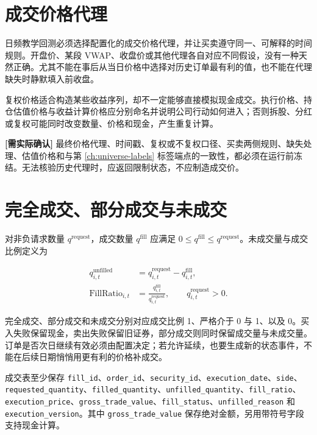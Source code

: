 \section{成交价格代理}

日频教学回测必须选择配置化的成交价格代理，并让买卖遵守同一、可解释的时间规则。开盘价、某段 VWAP、收盘价或其他代理各自对应不同假设，没有一种天然正确。尤其不能在事后从当日价格中选择对历史订单最有利的值，也不能在代理缺失时静默填入前收盘。

复权价格适合构造某些收益序列，却不一定能够直接模拟现金成交。执行价格、持仓估值价格与收益计算价格应分别命名并说明公司行动如何进入；否则拆股、分红或复权可能同时改变数量、价格和现金，产生重复计算。

\begin{confirmbox}
\textbf{[需实际确认]} 最终价格代理、时间戳、复权或不复权口径、买卖两侧规则、缺失处理、估值价格和与第 \cref{ch:universe-labels} 标签端点的一致性，都必须在运行前冻结。无法核验历史代理时，应返回限制状态，不应制造成交价。
\end{confirmbox}

\section{完全成交、部分成交与未成交}

对非负请求数量 \(q^{\mathrm{request}}\)，成交数量 \(q^{\mathrm{fill}}\) 应满足 \(0\le q^{\mathrm{fill}}\le q^{\mathrm{request}}\)。未成交量与成交比例定义为

\begin{align}
  q^{\mathrm{unfilled}}_{i,t}
  &=q^{\mathrm{request}}_{i,t}-q^{\mathrm{fill}}_{i,t},\\
  \mathrm{FillRatio}_{i,t}
  &=\frac{q^{\mathrm{fill}}_{i,t}}{q^{\mathrm{request}}_{i,t}},
  \qquad q^{\mathrm{request}}_{i,t}>0.
  \label{eq:ch10-fill-ratio}
\end{align}

完全成交、部分成交和未成交分别对应成交比例 1、严格介于 0 与 1、以及 0。买入失败保留现金，卖出失败保留旧证券，部分成交则同时保留成交量与未成交量。订单是否次日继续有效必须由配置决定；若允许延续，也要生成新的状态事件，不能在后续日期悄悄用更有利的价格补成交。

成交表至少保存 \texttt{fill\_id}、\texttt{order\_id}、\texttt{security\_id}、\texttt{execution\_date}、\texttt{side}、\texttt{requested\_quantity}、\texttt{filled\_quantity}、\texttt{unfilled\_quantity}、\texttt{fill\_ratio}、\texttt{execution\_price}、\texttt{gross\_trade\_value}、\texttt{fill\_status}、\texttt{unfilled\_reason} 和 \texttt{execution\_version}。其中 \texttt{gross\_trade\_value} 保存绝对金额，另用带符号字段支持现金计算。

